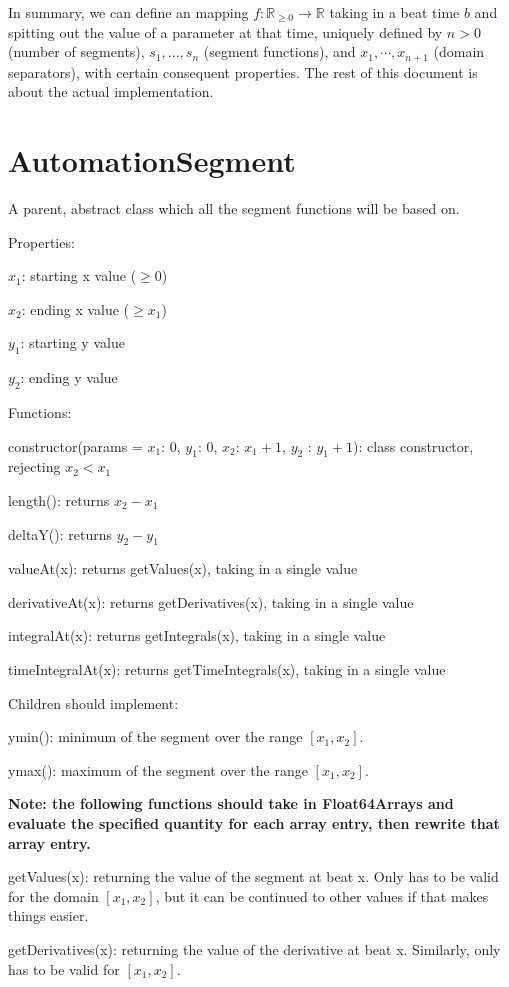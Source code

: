 \documentclass{article}
\begin{document}
In summary, we can define an mapping $f:\mathbb{R}_{\geq 0}\to \mathbb{R}$ taking in a beat time $b$ and spitting out the value of a parameter at that time, uniquely defined by $n>0$ (number of segments), $s_1, ..., s_n$ (segment functions), and $x_1, \cdots, x_{n+1}$ (domain separators), with certain consequent properties. The rest of this document is about the actual implementation.

\section{AutomationSegment}

A parent, abstract class which all the segment functions will be based on.

Properties:

$x_1$: starting x value ($\geq 0$)

$x_2$: ending x value ($\geq x_1$)

$y_1$: starting y value

$y_2$: ending y value

Functions:

constructor(params = {$x_1$: 0, $y_1$: 0, $x_2$: $x_1 + 1$, $y_2$ : $y_1+1$}): class constructor, rejecting $x_2 < x_1$

length(): returns $x_2 - x_1$

deltaY(): returns $y_2 - y_1$

valueAt(x): returns getValues(x), taking in a single value

derivativeAt(x): returns getDerivatives(x), taking in a single value

integralAt(x): returns getIntegrals(x), taking in a single value

timeIntegralAt(x): returns getTimeIntegrals(x), taking in a single value

Children should implement:

ymin(): minimum of the segment over the range $[x_1, x_2]$.

ymax(): maximum of the segment over the range $[x_1, x_2]$.

\textbf{Note: the following functions should take in Float64Arrays and evaluate the specified quantity for each array entry, then rewrite that array entry.}

getValues(x): returning the value of the segment at beat x. Only has to be valid for the domain $[x_1, x_2]$, but it can be continued to other values if that makes things easier.

getDerivatives(x): returning the value of the derivative at beat x. Similarly, only has to be valid for $[x_1, x_2]$.
\end{document}
